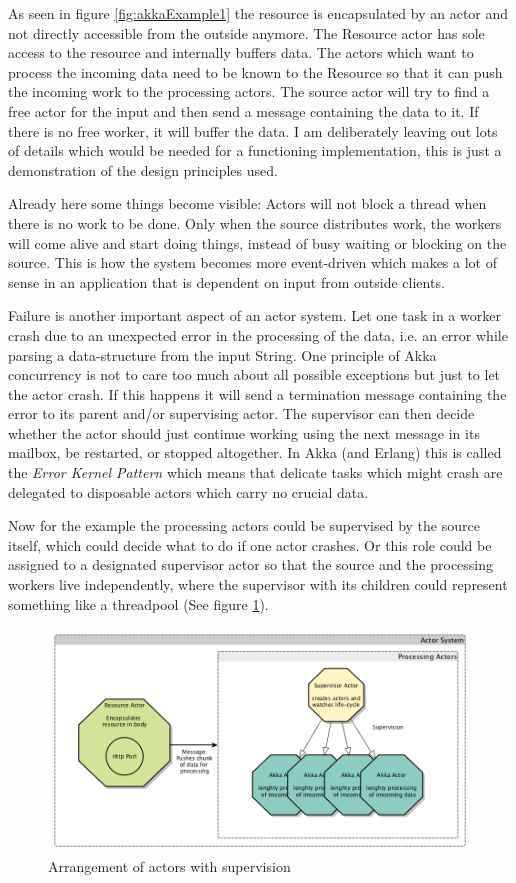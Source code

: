 \documentclass[twoside, 11pt]{scrartcl}
\begin{document}
As seen in figure \ref{fig:akkaExample1} the resource is encapsulated by an actor and not directly accessible from the outside anymore. The Resource actor has sole access to the resource and internally buffers data. The actors which want to process the incoming data need to be known to the Resource so that it can push the incoming work to the processing actors. The source actor will try to find a free actor for the input and then send a message containing the data to it. If there is no free worker, it will buffer the data. I am deliberately leaving out lots of details which would be needed for a functioning implementation, this is just a demonstration of the design principles used.

Already here some things become visible: Actors will not block a thread when there is no work to be done. Only when the source distributes work, the workers will come alive and start doing things, instead of busy waiting or blocking on the source. This is how the system becomes more event-driven which makes a lot of sense in an application that is dependent on input from outside clients.

Failure is another important aspect of an actor system. Let one task in a worker crash due to an unexpected error in the processing of the data, i.e. an error while parsing a data-structure from the input String. One principle of Akka concurrency is not to care too much about all possible exceptions but just to let the actor crash. If this happens it will send a termination message containing the error to its parent and/or supervising actor. 
The supervisor can then decide whether the actor should just continue working using the next message in its mailbox, be restarted, or stopped altogether.
In Akka (and Erlang) this is called the \textit{Error Kernel Pattern} which means that delicate tasks which might crash are delegated to disposable actors which carry no crucial data.

Now for the example the processing actors could be supervised by the source itself, which could decide what to do if one actor crashes. Or this role could be assigned to a designated supervisor actor so that the source and the processing workers live independently, where the supervisor with its children could represent something like a threadpool (See figure \ref{fig:akkaExample2}).

\begin{figure}[h]		
 	\includegraphics[scale=0.4]{figures/akkaExample2.png}
	\caption{Arrangement of actors with supervision}
	\label{fig:akkaExample2}
\end{figure}
\end{document}
